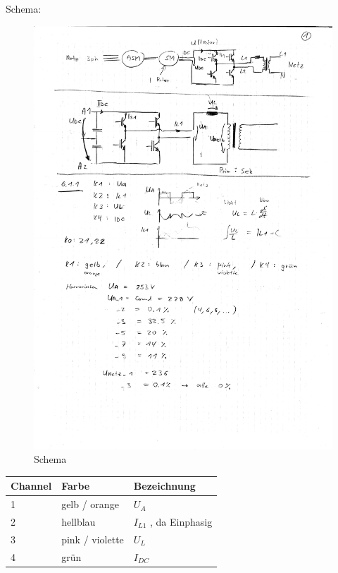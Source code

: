 
\noindent Schema:

\begin{figure}[H]
  \begin{center}
  \includegraphics[width=1\textwidth, trim={1cm 19.38cm 1cm 5cm},clip]{notes/scan1.pdf}
  \caption{Schema}
  \label{fig:schema}
  \end{center}
\end{figure}



\begin{center}
\begin{tabular}{ l | l | l }
  \hline 
  Channel & Farbe & Bezeichnung \\
  \hline \hline
  1 & gelb / orange &  $U_A$ \\
  \hline
  2 & hellblau & $I_{L1}$ , da Einphasig\\  
  \hline 
  3 & pink / violette & $U_{L}$ \\  
  \hline
  4 & grün & $I_{DC}$ \\  
  \hline
\end{tabular}
\end{center}



\clearpage
